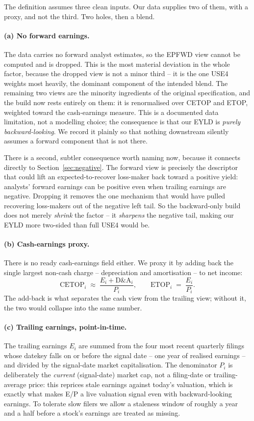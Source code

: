 \documentclass[11pt]{article}
\theoremstyle{definition}
\theoremstyle{plain}
\theoremstyle{remark}
\begin{document}
The definition assumes three clean inputs. Our data supplies two of them, with a proxy, and not the third. Two holes, then a blend.

\paragraph{(a) No forward earnings.} The data carries no forward analyst estimates, so the EPFWD view cannot be computed and is dropped. This is the most material deviation in the whole factor, because the dropped view is not a minor third -- it is the one USE4 weights most heavily, the dominant component of the intended blend. The remaining two views are the minority ingredients of the original specification, and the build now rests entirely on them: it is renormalised over CETOP and ETOP, weighted toward the cash-earnings measure. This is a documented data limitation, not a modelling choice; the consequence is that our EYLD is \emph{purely backward-looking}. We record it plainly so that nothing downstream silently assumes a forward component that is not there.

There is a second, subtler consequence worth naming now, because it connects directly to Section~\ref{sec:negative}. The forward view is precisely the descriptor that could lift an expected-to-recover loss-maker back toward a positive yield: analysts' forward earnings can be positive even when trailing earnings are negative. Dropping it removes the one mechanism that would have pulled recovering loss-makers out of the negative left tail. So the backward-only build does not merely \emph{shrink} the factor -- it \emph{sharpens} the negative tail, making our EYLD more two-sided than full USE4 would be.

\paragraph{(b) Cash-earnings proxy.} There is no ready cash-earnings field either. We proxy it by adding back the single largest non-cash charge -- depreciation and amortisation -- to net income:
\[
\text{CETOP}_i \;\approx\; \frac{E_i + \text{D\&A}_i}{P_i},
\qquad
\text{ETOP}_i \;=\; \frac{E_i}{P_i}.
\]
The add-back is what separates the cash view from the trailing view; without it, the two would collapse into the same number.

\paragraph{(c) Trailing earnings, point-in-time.} The trailing earnings $E_i$ are summed from the four most recent quarterly filings whose datekey falls on or before the signal date -- one year of realised earnings -- and divided by the signal-date market capitalisation. The denominator $P_i$ is deliberately the \emph{current} (signal-date) market cap, not a filing-date or trailing-average price: this reprices stale earnings against today's valuation, which is exactly what makes E/P a live valuation signal even with backward-looking earnings. To tolerate slow filers we allow a staleness window of roughly a year and a half before a stock's earnings are treated as missing.
\end{document}
